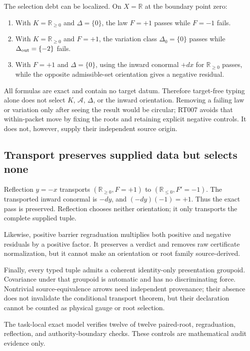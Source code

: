 \documentclass[11pt]{article}
\newcommand{\R}{\mathbb R}
\begin{document}
The selection debt can be localized.  On \(X=\R\) at the boundary point
zero:
\begin{enumerate}
  \item With \(K=\R_{\geq0}\) and \(\Delta=\{0\}\), the law \(F=+1\)
  passes while \(F=-1\) fails.
  \item With \(K=\R_{\geq0}\) and \(F=+1\), the variation class
  \(\Delta_0=\{0\}\) passes while \(\Delta_{\rm out}=\{-2\}\) fails.
  \item With \(F=+1\) and \(\Delta=\{0\}\), using the inward conormal
  \(+dx\) for \(\R_{\geq0}\) passes, while the opposite admissible-set
  orientation gives a negative residual.
\end{enumerate}
All formulas are exact and contain no target datum.  Therefore target-free
typing alone does not select \(K\), \(\mathcal A\), \(\Delta\), or the inward
orientation.  Removing a failing law or variation only after seeing the
result would be circular; RT007 avoids that within-packet move by fixing the
roots and retaining explicit negative controls.  It does not, however,
supply their independent source origin.

\subsection{Transport preserves supplied data but selects none}

Reflection \(y=-x\) transports
\((\R_{\geq0},F=+1)\) to
\((\R_{\leq0},F'=-1)\).  The transported inward conormal is \(-dy\), and
\((-dy)(-1)=+1\).  Thus the exact pass is preserved.  Reflection chooses
neither orientation; it only transports the complete supplied tuple.

Likewise, positive barrier regraduation multiplies both positive and negative
residuals by a positive factor.  It preserves a verdict and removes raw
certificate normalization, but it cannot make an orientation or root family
source-derived.

Finally, every typed tuple admits a coherent identity-only presentation
groupoid.  Covariance under that groupoid is automatic and has no
discriminating force.  Nontrivial source-equivalence arrows need independent
provenance; their absence does not invalidate the conditional transport
theorem, but their declaration cannot be counted as physical gauge or root
selection.

The task-local exact model verifies twelve of twelve paired-root,
regraduation, reflection, and authority-boundary checks.  These controls are
mathematical audit evidence only.
\end{document}
